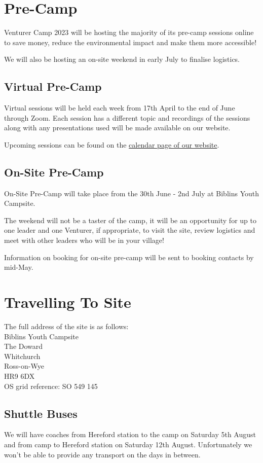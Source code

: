 \documentclass[a4paper, 11pt]{report}
\newcommand{\nl}{\newline}
\begin{document}
\chapter{Pre-Camp}
Venturer Camp 2023 will be hosting the majority of its pre-camp sessions online to save money, reduce the environmental impact and make them more accessible!\nl

We will also be hosting an on-site weekend in early July to finalise logistics.

\section{Virtual Pre-Camp}
Virtual sessions will be held each week from 17th April to the end of June through Zoom. Each session has a different topic and recordings of the sessions along with any presentations used will be made available on our website.\nl 

Upcoming sessions can be found on the \href{https://venturercamp.org.uk/calendar/}{calendar page of our website}.

\section{On-Site Pre-Camp}
On-Site Pre-Camp will take place from the 30th June - 2nd July at Biblins Youth Campsite. \nl

The weekend will not be a taster of the camp, it will be an opportunity for up to one leader and one Venturer, if appropriate, to visit the site, review logistics and meet with other leaders who will be in your village!\nl

Information on booking for on-site pre-camp will be sent to booking contacts by mid-May. 

\chapter{Travelling To Site}
The full address of the site is as follows:\\
Biblins Youth Campsite\\
The Doward\\
Whitchurch\\
Ross-on-Wye\\
HR9 6DX\\
OS grid reference: SO 549 145

\section{Shuttle Buses}
We will have coaches from Hereford station to the camp on Saturday 5th August and from camp to Hereford station on Saturday 12th August. Unfortunately we won't be able to provide any transport on the days in between.\nl
\end{document}

